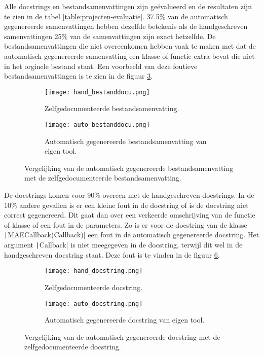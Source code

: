 Alle docstrings en bestandsamenvattingen zijn geëvalueerd en de resultaten zijn te zien in de tabel \ref{table:projecten-evaluatie}.
37.5\% van de automatisch gegenereerde samenvattingen hebben dezelfde betekenis als de handgeschreven samenvattingen 25\% van de samenvattingen zijn exact hetzelfde.
De bestandsamenvattingen die niet overeenkomen hebben vaak te maken met dat de automatisch gegenereerde samenvatting een klasse of functie extra bevat die niet in het orginele bestand staat.
Een voorbeeld van deze foutieve bestandsamenvattingen is te zien in de figuur \ref{fig:evaluate-bestand-samenvatting}.

\begin{figure}
    \centering
    \begin{subfigure}[b]{0.5\textwidth}
        \centering
        \texttt{[image: hand\_bestanddocu.png]}
        \caption{Zelfgedocumenteerde bestandsamenvatting.}
        \label{fig:zelfgedocumenteerd-bestandsamenvatting}
    \end{subfigure}
    \hfill
    \begin{subfigure}[b]{0.5\textwidth}
        \centering
        \texttt{[image: auto\_bestanddocu.png]}
        \caption{Automatisch gegenereerde bestandsamenvatting van eigen tool.}
        \label{fig:automatisch-bestandsamenvatting}
    \end{subfigure}
    \caption{Vergelijking van de automatisch gegenereerde bestandsamenvatting met de zelfgedocumenteerde bestandsamenvatting.}
    \label{fig:evaluate-bestand-samenvatting}
\end{figure}

De docstrings komen voor 90\% overeen met de handgeschreven docstrings.
In de 10\% andere gevallen is er een kleine fout in de docstring of is de docstring niet correct gegenereerd.
Dit gaat dan over een verkeerde omschrijving van de functie of klasse of een fout in de parameters.
Zo is er voor de docstring van de klasse \texttt|MAECallback(Callback)| een fout in de automatisch gegenereerde docstring.
Het argument \texttt|Callback| is niet meegegeven in de docstring, terwijl dit wel in de handgeschreven docstring staat.
Deze fout is te vinden in de figuur \ref{fig:evaluate-docstring}.

\begin{figure}
    \centering
    \begin{subfigure}[b]{0.5\textwidth}
        \centering
        \texttt{[image: hand\_docstring.png]}
        \caption{Zelfgedocumenteerde docstring.}
        \label{fig:zelfgedocumenteerd-docstring}
    \end{subfigure}
    \hfill
    \begin{subfigure}[b]{0.5\textwidth}
        \centering
        \texttt{[image: auto\_docstring.png]}
        \caption{Automatisch gegenereerde docstring van eigen tool.}
        \label{fig:automatisch-docstring}
    \end{subfigure}
    \caption{Vergelijking van de automatisch gegenereerde docstring met de zelfgedocumenteerde docstring.}
    \label{fig:evaluate-docstring}
\end{figure}

